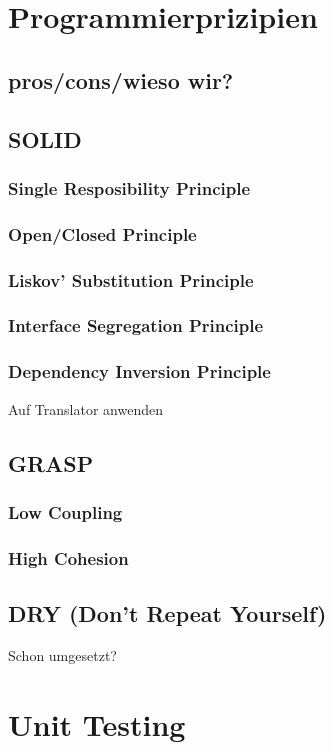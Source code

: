 \documentclass{article}
\begin{document}
\section{Programmierprizipien}
\subsection{pros/cons/wieso wir?}
\subsection{SOLID}
\subsubsection{Single Resposibility Principle}
\subsubsection{Open/Closed Principle}
\subsubsection{Liskov' Substitution Principle}
\subsubsection{Interface Segregation Principle}
\subsubsection{Dependency Inversion Principle}
Auf Translator anwenden
\subsection{GRASP}
\subsubsection{Low Coupling}
\subsubsection{High Cohesion}
\subsection{DRY (Don't Repeat Yourself)}
Schon umgesetzt?


\section{Unit Testing}
\end{document}
